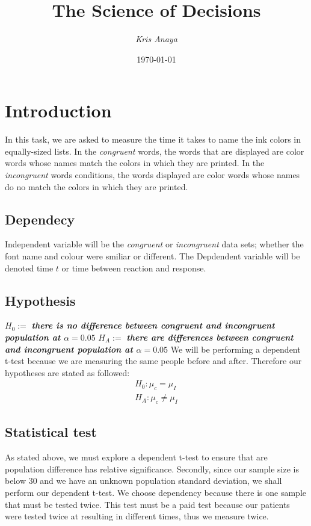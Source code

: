 \documentclass[8pt]{article}
\newcommand{\8}{\bar}
\begin{document}
 
\title{The Science of Decisions} 
\author{\textit{Kris Anaya}}
\date{\today} 
\maketitle

\section{Introduction}
In this task, we are asked to measure the time it takes to name the ink colors in equally-sized lists. In the \textit{congruent} words, the words that are displayed are color words whose names match the colors in which they are printed. In the \textit{incongruent} words conditions, the words displayed are color words whose names do no match the colors in which they are printed.
\subsection{Dependecy} 
Independent variable will be the \textit{congruent} or \textit{incongruent} data sets; whether the font name and colour were smiliar or different. The Depdendent variable will be denoted time $t$ or time between reaction and response. 
\subsection{Hypothesis} 
$H_{0} :=$ \textbf{\textit{there is no difference between \textit{congruent} and \textit{incongruent} population at $\alpha =0.05$}} \newline
$H_{A} :=$ \textbf{\textit{ there are differences between \textit{congruent} and \textit{incongruent} population at $\alpha = 0.05$}} \newline \newline
We will be performing a dependent t-test because we are measuring the same people before and after. Therefore our hypotheses are stated as followed: 
\begin{equation} 
\begin{split} 
H_{0}: \mu_{c} = \mu_{I} \\
H_{A}: \mu_{c} \not= \mu_{I} 
\end{split}
\end{equation} 
\subsection{Statistical test} 
As stated above, we must explore a dependent t-test to ensure that are population difference has relative significance. Secondly, since our sample size is below $30$ and we have an unknown population standard deviation, we shall perform our dependent t-test. We choose dependency because there is one sample that must be tested twice. This test must be a paid test because our patients were tested twice at resulting in different times, thus we measure twice. 
\end{document}
